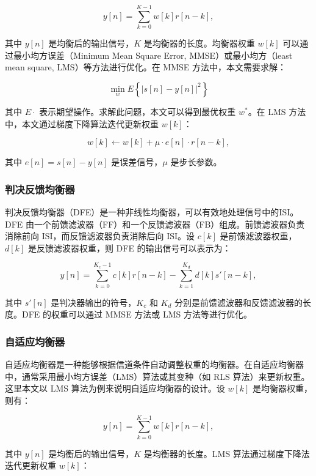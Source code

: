 \documentclass[UTF8,a4paper,12pt]{ctexart}
\numberwithin{equation}{section}
\begin{document}
	\begin{equation}
		y[n] = \sum_{k=0}^{K-1} w[k] r[n-k],
	\end{equation}
	
	其中 $y[n]$ 是均衡后的输出信号，$K$ 是均衡器的长度。均衡器权重 $w[k]$ 可以通过最小均方误差（Minimum Mean Square Error, MMSE）或最小均方（least mean square, LMS）等方法进行优化。在 MMSE 方法中，本文需要求解：
	
	\begin{equation}
		\min_w E\left\{ |s[n] - y[n]|^2 \right\}
	\end{equation}
	
	
	其中 $E{\cdot}$ 表示期望操作。求解此问题，本文可以得到最优权重 $w^*$。在 LMS 方法中，本文通过梯度下降算法迭代更新权重 $w[k]$：
	
	\begin{equation}
		w[k] \leftarrow w[k] + \mu \cdot e[n] \cdot r[n-k],
	\end{equation}
	
	其中 $e[n] = s[n] - y[n]$ 是误差信号，$\mu$ 是步长参数。
	\subsubsection{判决反馈均衡器}
	判决反馈均衡器（DFE）是一种非线性均衡器，可以有效地处理信号中的ISI。DFE 由一个前馈滤波器（FF）和一个反馈滤波器（FB）组成。前馈滤波器负责消除前向 ISI，而反馈滤波器负责消除后向 ISI。设 $c[k]$ 是前馈滤波器权重，$d[k]$ 是反馈滤波器权重，则 DFE 的输出信号可以表示为：
	
	\begin{equation}
		y[n] = \sum_{k=0}^{K_c-1} c[k] r[n-k] - \sum_{k=1}^{K_d} d[k] s'[n-k],
	\end{equation}
	
	其中 $s'[n]$ 是判决器输出的符号，$K_c$ 和 $K_d$ 分别是前馈滤波器和反馈滤波器的长度。DFE 的权重可以通过 MMSE 方法或 LMS 方法等进行优化。
	\subsubsection{自适应均衡器}
	自适应均衡器是一种能够根据信道条件自动调整权重的均衡器。在自适应均衡器中，通常采用最小均方误差（LMS）算法或其变种（如 RLS 算法）来更新权重。这里本文以 LMS 算法为例来说明自适应均衡器的设计。设 $w[k]$ 是均衡器权重，则有：
	
	\begin{equation}
		y[n] = \sum_{k=0}^{K-1} w[k] r[n-k],
	\end{equation}
	
	其中 $y[n]$ 是均衡后的输出信号，$K$ 是均衡器的长度。LMS 算法通过梯度下降法迭代更新权重 $w[k]$：
	
\end{document}
